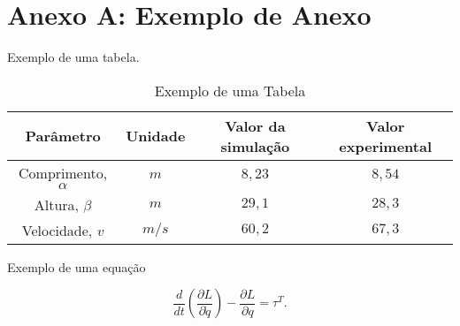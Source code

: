 \section{Anexo A: Exemplo de Anexo}
\label{anexoA}


Exemplo de uma tabela.

\begin{table}[ht]
\caption{Exemplo de uma Tabela}
\label{minhatab}

\center
\begin{tabular}{cccc}
  \hline
	Parâmetro & Unidade & Valor da simulação & Valor experimental   \\
	\hline
  Comprimento, $\alpha$ & $m$ &  $8,23$  & $8,54$ \\
  Altura, $\beta$ & $m$     &  $29,1$ & $28,3$\\
	Velocidade, $v$ & $m/s$  &  $60,2$ & $67,3$\\
	\hline
\end{tabular}
\end{table}




Exemplo de uma equação

\begin{equation} \label{eq:lagr1}
\frac{d}{dt}(\frac{\partial L}{\partial \dot{q}})-\frac{\partial L}{\partial q}=\tau^{T}.
\end{equation}

